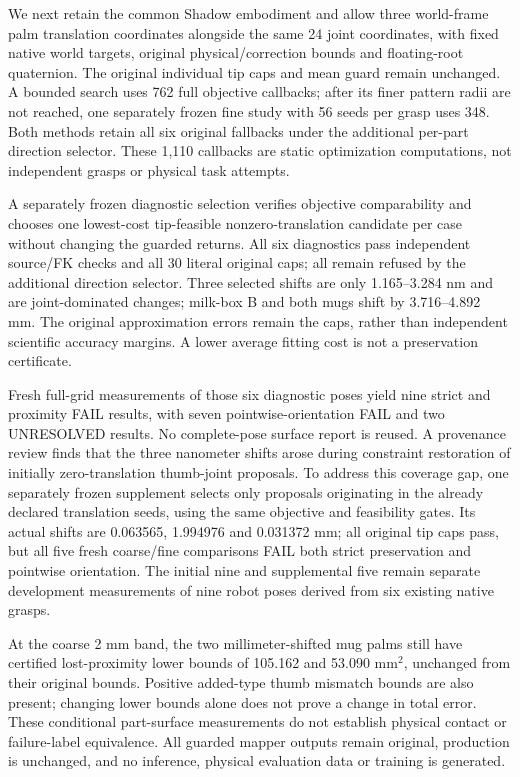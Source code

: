 \documentclass[10pt,letterpaper]{article}
\begin{document}
We next retain the common Shadow embodiment and allow three world-frame palm
translation coordinates alongside the same 24 joint coordinates, with fixed
native world targets, original physical/correction bounds and floating-root
quaternion. The original individual tip caps and mean guard remain unchanged.
A bounded search uses 762 full objective callbacks; after its finer pattern
radii are not reached, one separately frozen fine study with 56 seeds per grasp uses 348.
Both methods retain all six original fallbacks under the additional per-part
direction selector. These 1,110 callbacks are static optimization computations,
not independent grasps or physical task attempts.

A separately frozen diagnostic selection verifies objective comparability and
chooses one lowest-cost tip-feasible nonzero-translation candidate per case
without changing the guarded returns. All six diagnostics pass independent
source/FK checks and all 30 literal original caps; all remain refused by the
additional direction selector. Three selected shifts are only 1.165--3.284 nm and are
joint-dominated changes; milk-box B and both mugs shift by 3.716--4.892 mm.
The original approximation errors remain the caps, rather than independent
scientific accuracy margins. A lower average fitting cost is not a preservation
certificate.

Fresh full-grid measurements of those six diagnostic poses yield nine strict
and proximity FAIL results, with seven pointwise-orientation FAIL and two
UNRESOLVED results. No complete-pose surface report is reused. A provenance
review finds that the three nanometer shifts arose during constraint
restoration of initially zero-translation thumb-joint proposals. To address
this coverage gap, one separately frozen supplement selects only proposals
originating in the already declared translation seeds, using the same
objective and feasibility gates. Its actual shifts are 0.063565, 1.994976 and
0.031372 mm; all original tip caps pass, but all five fresh coarse/fine
comparisons FAIL both strict preservation and pointwise orientation. The
initial nine and supplemental five remain separate development measurements
of nine robot poses derived from six existing native grasps.

At the coarse 2 mm band, the two millimeter-shifted mug palms still have
certified lost-proximity lower bounds of 105.162 and 53.090 mm$^2$, unchanged
from their original bounds. Positive added-type thumb mismatch bounds are also
present; changing lower bounds alone does not prove a change in total error.
These conditional part-surface measurements do not establish physical contact
or failure-label equivalence. All guarded mapper outputs remain original,
production is unchanged, and no inference, physical evaluation data or training
is generated.
\end{document}
